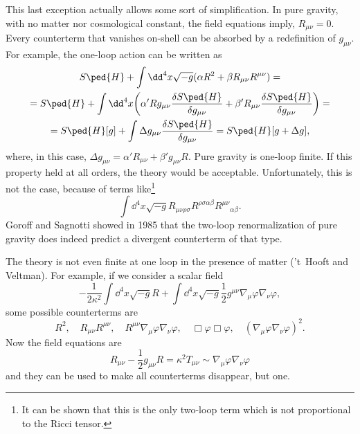 \documentclass[a4paper,12pt]{book}
\begin{document}
This last exception actually allows some sort of simplification. In pure gravity, with no matter nor cosmological constant, the field equations imply, $R_{\mu\nu}=0$. Every counterterm that vanishes on-shell can be absorbed by a redefinition of $g_{\mu\nu}$. For example, the one-loop action can be written as
\begin{multline*}
S\ped{H}+\int\dd^4x\sqrt{-g}(\alpha R^2+\beta R_{\mu\nu}R^{\mu\nu})=\\
=S\ped{H}+\int\dd^4x\biggl(\alpha'Rg_{\mu\nu}\frac{\delta S\ped{H}}{\delta g_{\mu\nu}}+\beta'R_{\mu\nu}\frac{\delta S\ped{H}}{\delta g_{\mu\nu}}\biggr)=\\
=S\ped{H}[g]+\int\Delta g_{\mu\nu}\frac{\delta S\ped{H}}{\delta g_{\mu\nu}}=S\ped{H}[g+\Delta g],
\end{multline*}
where, in this case, $\Delta g_{\mu\nu}=\alpha'R_{\mu\nu}+\beta'g_{\mu\nu}R$. Pure gravity is one-loop finite. If this property held at all orders, the theory would be acceptable. Unfortunately, this is not the case, because of terms like\footnote{It can be shown that this is the only two-loop term which is not proportional to the Ricci tensor.}
\[\int\dd^4x\sqrt{-g}R_{\mu\nu\rho\sigma}R^{\rho\sigma\alpha\beta}R^{\mu\nu}{}_{\alpha\beta}.\]
Goroff and Sagnotti showed in 1985 that the two-loop renormalization of pure gravity does indeed predict a divergent counterterm of that type.

The theory is not even finite at one loop in the presence of matter ('t~Hooft and Veltman). For example, if we consider a scalar field
\[-\frac1{2\kappa^2}\int\dd^4x\sqrt{-g}R+\int\dd^4x\sqrt{-g}\frac12g^{\mu\nu}\nabla_\mu\varphi\nabla_\nu\varphi,\]
some possible counterterms are
\[R^2,\quad R_{\mu\nu}R^{\mu\nu},\quad R^{\mu\nu}\nabla_\mu\varphi\nabla_\nu\varphi,\quad \Box\varphi\Box\varphi,\quad (\nabla_\mu\varphi\nabla_\nu\varphi)^2.\]
Now the field equations are
\[R_{\mu\nu}-\frac12g_{\mu\nu}R=\kappa^2T_{\mu\nu}\sim\nabla_\mu\varphi\nabla_\nu\varphi\]
and they can be used to make all counterterms disappear, but one.
\end{document}
